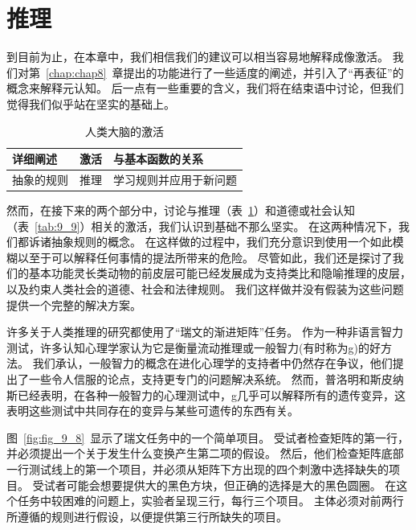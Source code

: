 \section{推理}

到目前为止，在本章中，我们相信我们的建议可以相当容易地解释成像激活。
我们对第~\ref{chap:chap8}~章提出的功能进行了一些适度的阐述，并引入了“再表征”的概念来解释元认知。
后一点有一些重要的含义，我们将在结束语中讨论，但我们觉得我们似乎站在坚实的基础上。

\par
\begin{table}[htbp] 
	\newcommand{\tabincell}[2]{\begin{tabular}{@{}#1@{}}#2\end{tabular}} %
	\centering
	\caption{人类大脑的激活\label{tab:9_8}}
	\renewcommand\arraystretch{1.5}	%
	\begin{tabular}{lll}
		\toprule
		详细阐述 & 激活 & 与基本函数的关系\\
		\midrule
		抽象的规则 & 推理 & 学习规则并应用于新问题  \\
		
		\bottomrule
		
	\end{tabular}%
\end{table}%


然而，在接下来的两个部分中，讨论与推理（表~\ref{tab:9_8}）和道德或社会认知（表~\ref{tab:9_9}）相关的激活，我们认识到基础不那么坚实。
在这两种情况下，我们都诉诸抽象规则的概念。
在这样做的过程中，我们充分意识到使用一个如此模糊以至于可以解释任何事情的提法所带来的危险。
尽管如此，我们还是探讨了我们的基本功能灵长类动物的前皮层可能已经发展成为支持类比和隐喻推理的皮层，以及约束人类社会的道德、社会和法律规则。
我们这样做并没有假装为这些问题提供一个完整的解决方案。


许多关于人类推理的研究都使用了“瑞文的渐进矩阵”任务\cite{raven1983manual}。
作为一种非语言智力测试，许多认知心理学家认为它是衡量流动推理\cite{cattell1973technical}或一般智力(有时称为g)的好方法\cite{duncan2010intelligence}。
我们承认，一般智力的概念在进化心理学的支持者中仍然存在争议，他们提出了一些令人信服的论点，支持更专门的问题解决系统。
然而，普洛明和斯皮纳斯\cite{plomin1999genetics}已经表明，在各种一般智力的心理测试中，g几乎可以解释所有的遗传变异，这表明这些测试中共同存在的变异与某些可遗传的东西有关。


图~\ref{fig:fig_9_8}~显示了瑞文任务中的一个简单项目。
受试者检查矩阵的第一行，并必须提出一个关于发生什么变换产生第二项的假设。
然后，他们检查矩阵底部一行测试线上的第一个项目，并必须从矩阵下方出现的四个刺激中选择缺失的项目。
受试者可能会想要提供大的黑色方块，但正确的选择是大的黑色圆圈。
在这个任务中较困难的问题上，实验者呈现三行，每行三个项目。
主体必须对前两行所遵循的规则进行假设，以便提供第三行所缺失的项目。




